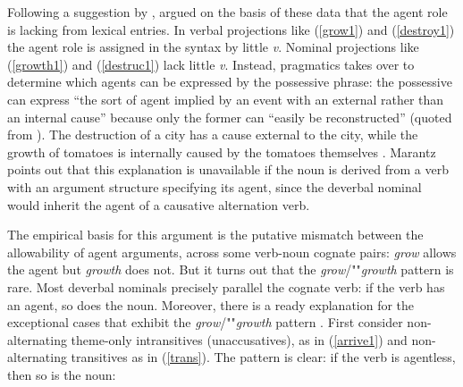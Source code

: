\noindent
Following a suggestion by \citet{Chomsky70a}, \citet{Marantz97a} argued on the basis of these data
that the agent role is lacking from lexical entries. In verbal projections like (\ref{grow1}) and
(\ref{destroy1}) the agent role is assigned in the syntax by little \emph{v}.  Nominal projections
like (\ref{growth1}) and (\ref{destruc1}) lack little  \emph{v}.  Instead, pragmatics takes over to
determine which agents can be expressed by the possessive phrase: the possessive can express ``the
sort of agent implied by an event with an external rather than an internal cause'' because only the
former can ``easily be reconstructed'' (quoted from \citet[]{Marantz97a}).
The destruction of a city has a cause external to the city, while the growth of tomatoes is
internally caused by the tomatoes themselves \citep{Smith70a-u}.  Marantz points out that this
explanation is unavailable if the noun is derived from a verb with an argument structure specifying
its agent, since the deverbal nominal would inherit the agent of a causative alternation verb.   

The empirical basis for this argument is the putative mismatch between the allowability of agent
arguments, across some verb-noun cognate pairs: \eg \emph{grow} allows the agent but \emph{growth}
does not.  But it turns out that the \emph{grow}/""\emph{growth} pattern is rare. Most deverbal nominals
precisely parallel the cognate verb: if the verb has an agent, so does the noun.  Moreover, there is
a ready explanation for the exceptional cases that exhibit the \emph{grow}/""\emph{growth} pattern
\citep{Wechsler2008a}.  First consider non-alternating theme-only intransitives
(unaccusatives), as in (\ref{arrive1}) and non-alternating transitives as in
(\ref{trans}).  The pattern is clear: if the verb is agentless, then so is the noun:  

